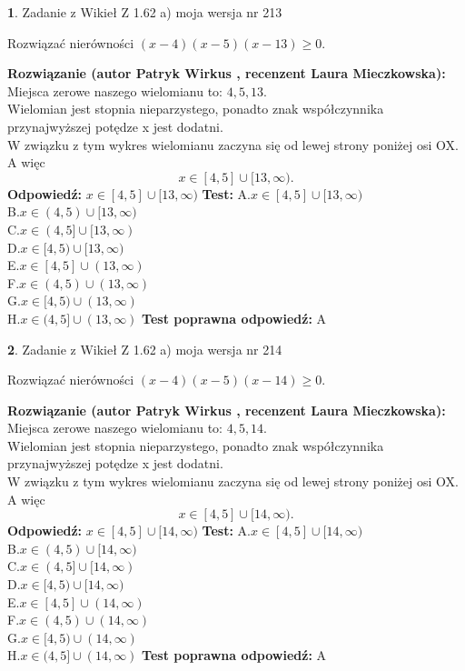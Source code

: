 \documentclass[12pt, a4paper]{article}
\theoremstyle{definition} %
\newtheorem{zad}{}
\newcommand{\zadStart}[1]{\begin{zad}#1\newline}
\newcommand{\zadStop}{\end{zad}}
\newcommand{\rozwStart}[2]{\noindent \textbf{Rozwiązanie (autor #1 , recenzent #2): }\newline}
\newcommand{\rozwStop}{\newline}
\newcommand{\odpStart}{\noindent \textbf{Odpowiedź:}\newline}
\newcommand{\odpStop}{\newline}
\newcommand{\testStart}{\noindent \textbf{Test:}\newline}
\newcommand{\testStop}{\newline}
\newcommand{\kluczStart}{\noindent \textbf{Test poprawna odpowiedź:}\newline}
\newcommand{\kluczStop}{\newline}
\begin{document}
\zadStart{Zadanie z Wikieł Z 1.62 a) moja wersja nr 213}

Rozwiązać nierówności $(x-4)(x-5)(x-13)\ge0$.
\zadStop
\rozwStart{Patryk Wirkus}{Laura Mieczkowska}
Miejsca zerowe naszego wielomianu to: $4, 5, 13$.\\
Wielomian jest stopnia nieparzystego, ponadto znak współczynnika przy\linebreak najwyższej potędze x jest dodatni.\\ W związku z tym wykres wielomianu zaczyna się od lewej strony poniżej osi OX. A więc $$x \in [4,5] \cup [13,\infty).$$
\rozwStop
\odpStart
$x \in [4,5] \cup [13,\infty)$
\odpStop
\testStart
A.$x \in [4,5] \cup [13,\infty)$\\
B.$x \in (4,5) \cup [13,\infty)$\\
C.$x \in (4,5] \cup [13,\infty)$\\
D.$x \in [4,5) \cup [13,\infty)$\\
E.$x \in [4,5] \cup (13,\infty)$\\
F.$x \in (4,5) \cup (13,\infty)$\\
G.$x \in [4,5) \cup (13,\infty)$\\
H.$x \in (4,5] \cup (13,\infty)$
\testStop
\kluczStart
A
\kluczStop



\zadStart{Zadanie z Wikieł Z 1.62 a) moja wersja nr 214}

Rozwiązać nierówności $(x-4)(x-5)(x-14)\ge0$.
\zadStop
\rozwStart{Patryk Wirkus}{Laura Mieczkowska}
Miejsca zerowe naszego wielomianu to: $4, 5, 14$.\\
Wielomian jest stopnia nieparzystego, ponadto znak współczynnika przy\linebreak najwyższej potędze x jest dodatni.\\ W związku z tym wykres wielomianu zaczyna się od lewej strony poniżej osi OX. A więc $$x \in [4,5] \cup [14,\infty).$$
\rozwStop
\odpStart
$x \in [4,5] \cup [14,\infty)$
\odpStop
\testStart
A.$x \in [4,5] \cup [14,\infty)$\\
B.$x \in (4,5) \cup [14,\infty)$\\
C.$x \in (4,5] \cup [14,\infty)$\\
D.$x \in [4,5) \cup [14,\infty)$\\
E.$x \in [4,5] \cup (14,\infty)$\\
F.$x \in (4,5) \cup (14,\infty)$\\
G.$x \in [4,5) \cup (14,\infty)$\\
H.$x \in (4,5] \cup (14,\infty)$
\testStop
\kluczStart
A
\kluczStop
\end{document}
